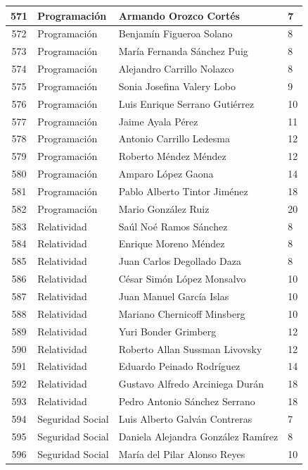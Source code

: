 {\begin{longtable}{|c|p{6.5cm}|p{5cm}|p{1.5cm}|}
  571 & Programación & Armando Orozco Cortés & 7 \\ \hline
  572 & Programación & Benjamín Figueroa Solano & 8 \\ \hline
  573 & Programación & María Fernanda Sánchez Puig & 8 \\ \hline
  574 & Programación & Alejandro Carrillo Nolazco & 8 \\ \hline
  575 & Programación & Sonia Josefina Valery Lobo & 9 \\ \hline
  576 & Programación & Luis Enrique Serrano Gutiérrez & 10 \\ \hline
  577 & Programación & Jaime Ayala Pérez & 11 \\ \hline
  578 & Programación & Antonio Carrillo Ledesma & 12 \\ \hline
  579 & Programación & Roberto Méndez Méndez & 12 \\ \hline
  580 & Programación & Amparo López Gaona & 14 \\ \hline
  581 & Programación & Pablo Alberto Tintor Jiménez & 18 \\ \hline
  582 & Programación & Mario González Ruiz & 20 \\ \hline
  583 & Relatividad & Saúl Noé Ramos Sánchez & 8 \\ \hline
  584 & Relatividad & Enrique Moreno Méndez & 8 \\ \hline
  585 & Relatividad & Juan Carlos Degollado Daza & 8 \\ \hline
  586 & Relatividad & César Simón López Monsalvo & 10 \\ \hline
  587 & Relatividad & Juan Manuel García Islas & 10 \\ \hline
  588 & Relatividad & Mariano Chernicoff Minsberg & 10 \\ \hline
  589 & Relatividad & Yuri Bonder Grimberg & 12 \\ \hline
  590 & Relatividad & Roberto Allan Sussman Livovsky & 12 \\ \hline
  591 & Relatividad & Eduardo Peinado Rodríguez & 14 \\ \hline
  592 & Relatividad & Gustavo Alfredo Arciniega Durán & 18 \\ \hline
  593 & Relatividad & Pedro Antonio Sánchez Serrano & 18 \\ \hline
  594 & Seguridad Social & Luis Alberto Galván Contreras & 7 \\ \hline
  595 & Seguridad Social & Daniela Alejandra González Ramírez & 8 \\ \hline
  596 & Seguridad Social & María del Pilar Alonso Reyes & 10 \\ \hline

\end{longtable}}
